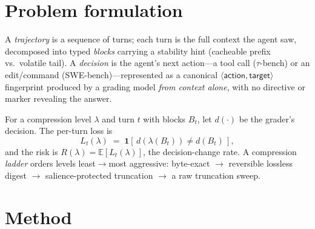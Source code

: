 \documentclass[11pt]{article}
\begin{document}
\section{Problem formulation}
\label{sec:problem}
A \emph{trajectory} is a sequence of turns; each turn is the full context the agent
saw, decomposed into typed \emph{blocks} carrying a stability hint (cacheable prefix
vs.\ volatile tail). A \emph{decision} is the agent's next action---a tool call
($\tau$-bench) or an edit/command (SWE-bench)---represented as a canonical
$\langle\textsf{action},\textsf{target}\rangle$ fingerprint produced by a grading
model \emph{from context alone}, with no directive or marker revealing the answer.

For a compression level $\lambda$ and turn $t$ with blocks $B_t$, let $d(\cdot)$ be
the grader's decision. The per-turn loss is
\[
  L_t(\lambda) \;=\; \mathbf{1}\!\left[\, d(\lambda(B_t)) \neq d(B_t) \,\right],
\]
and the risk is $R(\lambda)=\mathbb{E}[L_t(\lambda)]$, the decision-change rate. A
compression \emph{ladder} orders levels least$\to$most aggressive: byte-exact
$\to$ reversible lossless digest $\to$ salience-protected truncation $\to$ a raw
truncation sweep.

\section{Method}
\label{sec:method}
\end{document}
